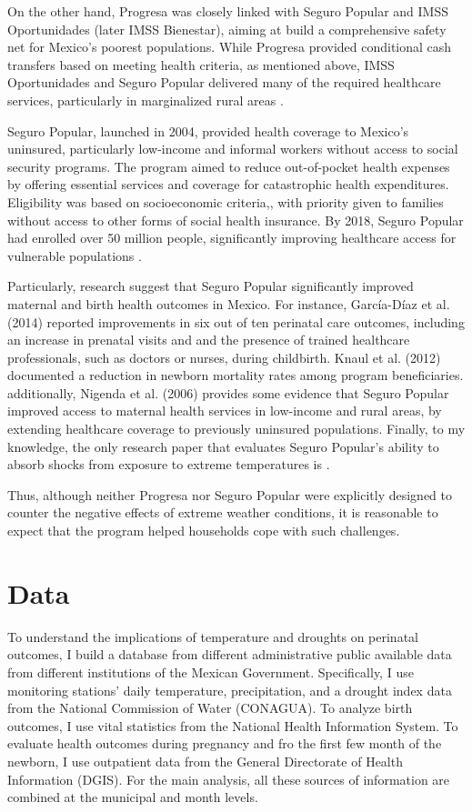 \documentclass[12pt, oneside]{article}      %
\begin{document}
On the other hand, Progresa was closely linked with Seguro Popular and IMSS Oportunidades (later IMSS Bienestar), aiming at build a comprehensive safety net for Mexico's poorest populations. While Progresa provided conditional cash transfers based on meeting health criteria, as mentioned above, IMSS Oportunidades and Seguro Popular delivered many of the required healthcare services, particularly in marginalized rural areas \cite{gonzalez2020mexico}.

Seguro Popular, launched in 2004, provided health coverage to Mexico's uninsured, particularly low-income and informal workers without access to social security programs. The program aimed to reduce out-of-pocket health expenses by offering essential services and coverage for catastrophic health expenditures. Eligibility was based on socioeconomic criteria,, with priority given to families without access to other forms of social health insurance. By 2018, Seguro Popular had enrolled over 50 million people, significantly improving healthcare access for vulnerable populations \cite{ChemorRuiz2018}.

Particularly, research suggest that Seguro Popular significantly improved maternal and birth health outcomes in Mexico. For instance, García-Díaz et al. (2014) reported improvements in six out of ten perinatal care outcomes, including an increase in prenatal visits and and the presence of trained healthcare professionals, such as doctors or nurses, during childbirth. Knaul et al. (2012) documented a reduction in newborn mortality rates among program beneficiaries. 
additionally, Nigenda et al. (2006) provides some evidence that Seguro Popular improved access to maternal health services in low-income and rural areas, by extending healthcare coverage to previously uninsured populations. Finally, to my knowledge, the only research paper that evaluates Seguro Popular's ability to absorb shocks from exposure to extreme temperatures is \cite{Cohen2022}.

Thus, although neither Progresa nor Seguro Popular were explicitly designed to counter the negative effects of extreme weather conditions, it is reasonable to expect that the program helped households cope with such challenges.



\section{Data}

To understand the implications of temperature and droughts on perinatal outcomes, I build a database from different administrative public available data from different institutions of the Mexican Government. Specifically, I use monitoring stations' daily temperature, precipitation, and a drought index data from the National Commission of Water (CONAGUA). To analyze birth outcomes, I use vital statistics from the National Health Information System. To evaluate health outcomes during pregnancy and fro the first few month of the newborn, I use outpatient data from the General Directorate of Health Information (DGIS). For the main analysis, all these sources of information are combined at the municipal and month levels. 
\end{document}
